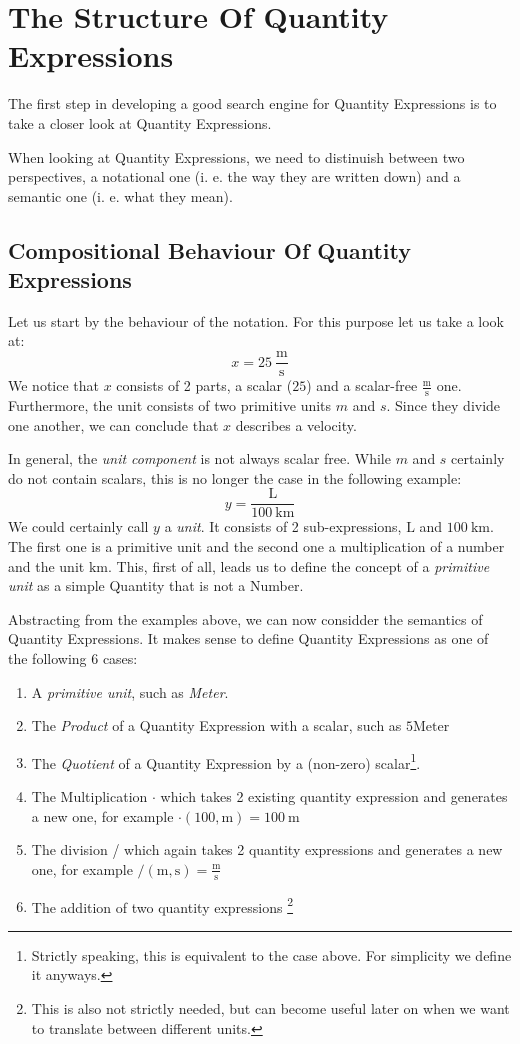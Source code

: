 \section{The Structure Of Quantity Expressions}
\label{sec:strucqe}

The first step in developing a good search engine for Quantity Expressions is to take a closer look at Quantity Expressions.

When looking at Quantity Expressions, we need to distinuish between two perspectives, a notational one (i. e. the way they are written down) and a semantic one (i. e. what they mean).

\subsection{Compositional Behaviour Of Quantity Expressions}
Let us start by the behaviour of the notation. For this purpose let us take a look at:
\[x = 25\ \frac{\text{m}}{\text{s}}\]
We notice that $x$ consists of 2 parts, a scalar ($25$) and a scalar-free $\frac{\text{m}}{\text{s}}$ one. Furthermore, the unit consists of two primitive units $m$ and $s$. Since they divide one another, we can conclude that $x$ describes a velocity.

In general, the \textit{unit component} is not always scalar free. While $m$ and $s$ certainly do not contain scalars, this is no longer the case in the following example:
\[y = \frac{\text{L}}{100\ \text{km}}\]
We could certainly call $y$ a \textit{unit}. It consists of 2 sub-expressions, $\text{L}$ and $100\ \text{km}$. The first one is a primitive unit and the second one a multiplication of a number and the unit $\text{km}$. This, first of all, leads us to define the concept of a \textit{primitive unit} as a simple Quantity that is not a Number.

Abstracting from the examples above, we can now considder the semantics of Quantity Expressions. It makes sense to define Quantity Expressions as one of the following 6 cases:
\begin{enumerate}
  \item A \textit{primitive unit}, such as \textit{Meter}.
  \item The \textit{Product} of a Quantity Expression with a scalar, such as $5 \text{Meter}$
  \item The \textit{Quotient} of a Quantity Expression by a (non-zero) scalar\footnote{Strictly speaking, this is equivalent to the case above. For simplicity we define it anyways. }.
  \item The Multiplication $\cdot{}$ which takes 2 existing quantity expression and generates a new one, for example $\cdot \left(100, \text{m} \right) = 100\ \text{m}$
  \item The division / which again takes 2 quantity expressions and generates a new one, for example $\text{/} (\text{m}, \text{s}) = \frac{\text{m}}{\text{s}}$
  \item The addition of two quantity expressions \footnote{This is also not strictly needed, but can become useful later on when we want to translate between different units. }
\end{enumerate}

